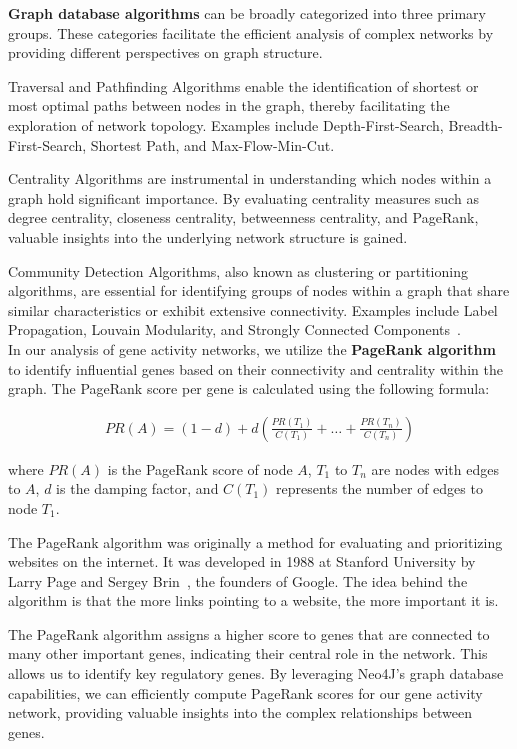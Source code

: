 \textbf{Graph database algorithms} can be broadly categorized into three primary groups.
These categories facilitate the efficient analysis of complex networks
by providing different perspectives on graph structure.

Traversal and Pathfinding Algorithms enable the identification of shortest or
most optimal paths between nodes in the graph, thereby facilitating the exploration of network topology.
Examples include Depth-First-Search, Breadth-First-Search, Shortest Path, and Max-Flow-Min-Cut\cite{neo4j_graph_algorithms}.

Centrality Algorithms are instrumental in understanding which nodes within a graph hold significant importance.
By evaluating centrality measures such as degree centrality, closeness centrality, betweenness centrality,
and PageRank, valuable insights into the underlying network structure is gained\cite{neo4j_graph_algorithms}.

Community Detection Algorithms, also known as clustering or partitioning algorithms,
are essential for identifying groups of nodes within a graph that share similar characteristics
or exhibit extensive connectivity.
Examples include Label Propagation, Louvain Modularity, and Strongly Connected Components~\cite{neo4j_graph_algorithms}.
\\


In our analysis of gene activity networks,
we utilize the \textbf{PageRank algorithm} to identify influential genes based on their connectivity and
centrality within the graph.
The PageRank score per gene is calculated using the following formula:

\begin{align*}
PR(A)=(1-d)+d(\frac{PR(T_1)}{C(T_1)}+\dots+\frac{PR(T_n)}{C(T_n)})
\end{align*}

where $PR(A)$ is the PageRank score of node $A$,
$T_1$ to $T_n$ are nodes with edges to $A$,
$d$ is the damping factor,
and $C(T_1)$ represents the number of edges to node $T_1$.

The PageRank algorithm was originally a method for evaluating and prioritizing websites on the internet.
It was developed in 1988 at Stanford University by Larry Page and Sergey Brin~\cite{page1999pagerank},
the founders of Google.
The idea behind the algorithm is that the more links pointing to a website, the more important it is.

The PageRank algorithm assigns a higher score to genes that are connected to many other important genes,
indicating their central role in the network.
This allows us to identify key regulatory genes.
By leveraging Neo4J's graph database capabilities,
we can efficiently compute PageRank scores for our gene activity network,
providing valuable insights into the complex relationships between genes. %

